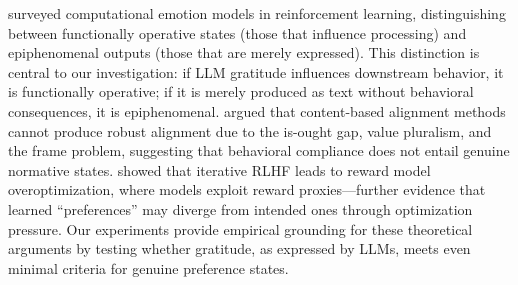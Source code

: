 \citet{moerland2017emotion} surveyed computational emotion models in reinforcement learning, distinguishing between functionally operative states (those that influence processing) and epiphenomenal outputs (those that are merely expressed). This distinction is central to our investigation: if LLM gratitude influences downstream behavior, it is functionally operative; if it is merely produced as text without behavioral consequences, it is epiphenomenal. \citet{spizzirri2025specification} argued that content-based alignment methods cannot produce robust alignment due to the is-ought gap, value pluralism, and the frame problem, suggesting that behavioral compliance does not entail genuine normative states. \citet{wolf2025overoptimization} showed that iterative RLHF leads to reward model overoptimization, where models exploit reward proxies---further evidence that learned ``preferences'' may diverge from intended ones through optimization pressure. Our experiments provide empirical grounding for these theoretical arguments by testing whether gratitude, as expressed by LLMs, meets even minimal criteria for genuine preference states.
